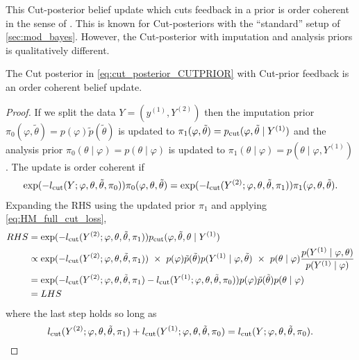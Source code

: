 This Cut-posterior belief update which cuts feedback in a prior is order coherent in the sense of \cite{Bissiri2016}.
This is known \citep{Carmona2020smi} for Cut-posteriors with the ``standard'' setup of \cref{sec:mod_bayes}.
However, the Cut-posterior with imputation and analysis priors is qualitatively different.

\begin{proposition}\label{prop:cut_prior_is_OK}
  The Cut posterior in \cref{eq:cut_posterior_CUTPRIOR} with Cut-prior feedback is an order coherent belief update.
\end{proposition}
\begin{proof}\label{proof:cut_prior_is_OK}
  If we split the data $Y=(y^{(1)},Y^{(2)})$ then the imputation prior
  $\pi_0(\varphi,\tilde\theta)=p(\varphi)\tilde p(\tilde\theta)$ is updated to $\pi_1(\varphi,\tilde\theta)=p_{\operatorname{\text{cut}}}(\varphi,\tilde\theta \mid Y^{(1)})$ and the analysis prior $\pi_0(\theta \mid \varphi)=p(\theta \mid \varphi)$ is updated to $\pi_1(\theta \mid \varphi)=p(\theta \mid \varphi,Y^{(1)})$.
  The update is order coherent if
  \begin{align*}
    \exp(-l_{\operatorname{\text{cut}}}(Y; \varphi,\theta,\tilde\theta, \pi_0))\pi_0(\varphi,\theta,\tilde\theta) = \exp(-l_{\operatorname{\text{cut}}}(Y^{(2)}; \varphi,\theta,\tilde\theta, \pi_1))\pi_1(\varphi,\theta,\tilde\theta).
  \end{align*}
  Expanding the RHS using the updated prior $\pi_1$ and applying \cref{eq:HM_full_cut_loss},
  \begin{align*}
    RHS & = \exp(-l_{\operatorname{\text{cut}}}(Y^{(2)}; \varphi,\theta,\tilde\theta, \pi_1))p_{\operatorname{\text{cut}}}(\varphi,\tilde\theta,\theta \mid Y^{(1)})                                                                                                                                 \\
        & \propto \exp(-l_{\operatorname{\text{cut}}}(Y^{(2)}; \varphi,\theta,\tilde\theta, \pi_1))\ \times\ p(\varphi)\tilde p(\tilde\theta)p(Y^{(1)} \mid \varphi,\tilde\theta)\ \times\ p(\theta \mid \varphi)\frac{p(Y^{(1)} \mid \varphi,\theta)}{p(Y^{(1)} \mid \varphi)} \\
        & = \exp(-l_{\operatorname{\text{cut}}}(Y^{(2)}; \varphi,\theta,\tilde\theta, \pi_1)-l_{\operatorname{\text{cut}}}(Y^{(1)}; \varphi,\theta,\tilde\theta, \pi_0))p(\varphi)\tilde p(\tilde\theta)p(\theta \mid \varphi)                                                                       \\
        & =LHS
  \end{align*}
  where the last step holds so long as
  \[
    l_{\operatorname{\text{cut}}}(Y^{(2)}; \varphi,\theta,\tilde\theta, \pi_1)+l_{\operatorname{\text{cut}}}(Y^{(1)}; \varphi,\theta,\tilde\theta, \pi_0)=l_{\operatorname{\text{cut}}}(Y; \varphi,\theta,\tilde\theta, \pi_0).
\]
\end{proof}
